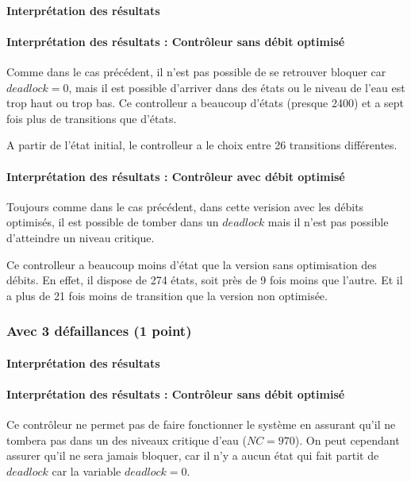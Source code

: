 \documentclass[a4paper]{book}
\begin{document}
\paragraph{Interprétation des résultats}
\paragraph{Interprétation des résultats : Contrôleur sans débit optimisé}
Comme dans le cas précédent, il n'est pas possible de se retrouver bloquer car $deadlock=0$, mais il est possible d'arriver dans des états ou le niveau de l'eau est trop haut ou trop bas.
Ce controlleur a beaucoup d'états (presque 2400) et a sept fois plus de transitions que d'états.

A partir de l'état initial, le controlleur a le choix entre 26 transitions différentes.
\paragraph{Interprétation des résultats : Contrôleur avec débit optimisé}
Toujours comme dans le cas précédent, dans cette verision avec les débits optimisés, il est possible de tomber dans un $deadlock$ mais il n'est pas possible d'atteindre un niveau critique.

Ce controlleur a beaucoup moins d'état que la version sans optimisation des débits. En effet, il dispose de 274 états, soit près de 9 fois moins que l'autre.
Et il a plus de 21 fois moins de transition que la version non optimisée.


\subsubsection{Avec 3 défaillances (1 point)}


%
%
%
\paragraph{Interprétation des résultats}
\paragraph{Interprétation des résultats : Contrôleur sans débit optimisé}
Ce contrôleur ne permet pas de faire fonctionner le système en assurant qu'il ne tombera pas dans un des niveaux critique d'eau ($NC = 970$).
On peut cependant assurer qu'il ne sera jamais bloquer, car il n'y a aucun état qui fait partit de $deadlock$ car la variable $deadlock=0$.
\end{document}
